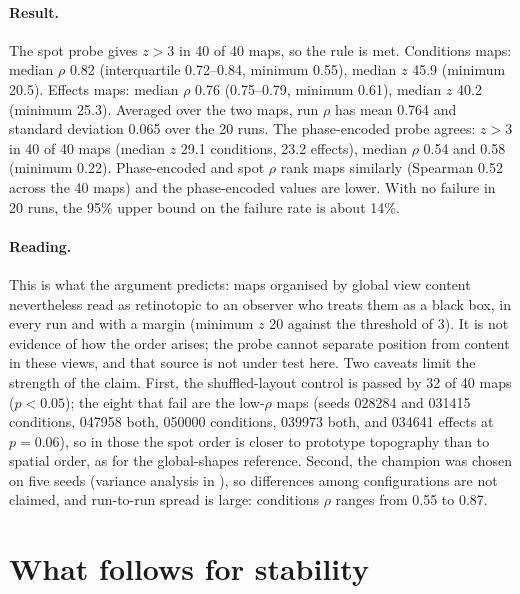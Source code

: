 \documentclass[11pt,a4paper]{article}
\newcommand{\code}[1]{\path{#1}}
\begin{document}
\paragraph{Result.} The spot probe gives $z>3$ in 40 of 40 maps, so the rule is met.
Conditions maps: median $\rho$ 0.82 (interquartile 0.72--0.84, minimum 0.55), median
$z$ 45.9 (minimum 20.5). Effects maps: median $\rho$ 0.76 (0.75--0.79, minimum 0.61),
median $z$ 40.2 (minimum 25.3). Averaged over the two maps, run $\rho$ has mean 0.764
and standard deviation 0.065 over the 20 runs. The phase-encoded probe agrees: $z>3$
in 40 of 40 maps (median $z$ 29.1 conditions, 23.2 effects), median $\rho$ 0.54 and
0.58 (minimum 0.22). Phase-encoded and spot $\rho$ rank maps similarly (Spearman
0.52 across the 40 maps) and the phase-encoded values are lower. With no failure in
20 runs, the 95\% upper bound on the failure rate is about 14\%.

\paragraph{Reading.} This is what the argument predicts: maps organised by global view
content nevertheless read as retinotopic to an observer who treats them as a black box,
in every run and with a margin (minimum $z$ 20 against the threshold of 3). It is not
evidence of how the order arises; the probe cannot separate position from content in
these views, and that source is not under test here. Two caveats limit the strength of
the claim. First, the shuffled-layout control is passed by 32 of 40 maps ($p<0.05$);
the eight that fail are the low-$\rho$ maps (seeds 028284 and 031415 conditions,
047958 both, 050000 conditions, 039973 both, and 034641 effects at $p=0.06$), so
in those the spot order is closer to prototype topography than to spatial order, as for
the global-shapes reference. Second, the champion was chosen on five seeds (variance
analysis in \code{champion.md}), so differences among configurations are not claimed,
and run-to-run spread is large: conditions $\rho$ ranges from 0.55 to 0.87.

\section{What follows for stability}
\label{sec:stability}
\end{document}
